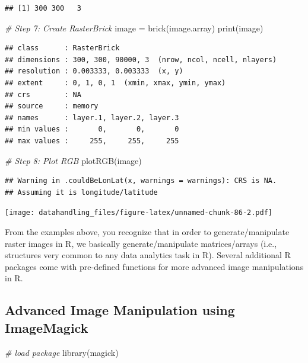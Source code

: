 \documentclass[
  12pt,
]{style/krantz}
\newenvironment{Shaded}{\begin{snugshade}}{\end{snugshade}}
\newcommand{\CommentTok}[1]{\textcolor[rgb]{0.56,0.35,0.01}{\textit{#1}}}
\newcommand{\FunctionTok}[1]{\textcolor[rgb]{0.00,0.00,0.00}{#1}}
\newcommand{\NormalTok}[1]{#1}
\newcommand{\OtherTok}[1]{\textcolor[rgb]{0.56,0.35,0.01}{#1}}
\begin{document}
\begin{verbatim}
## [1] 300 300   3
\end{verbatim}

\begin{Shaded}
\begin{Highlighting}[]
\CommentTok{\# Step 7: Create RasterBrick}
\NormalTok{image }\OtherTok{=} \FunctionTok{brick}\NormalTok{(image.array)}
\FunctionTok{print}\NormalTok{(image)}
\end{Highlighting}
\end{Shaded}

\begin{verbatim}
## class      : RasterBrick 
## dimensions : 300, 300, 90000, 3  (nrow, ncol, ncell, nlayers)
## resolution : 0.003333, 0.003333  (x, y)
## extent     : 0, 1, 0, 1  (xmin, xmax, ymin, ymax)
## crs        : NA 
## source     : memory
## names      : layer.1, layer.2, layer.3 
## min values :       0,       0,       0 
## max values :     255,     255,     255
\end{verbatim}

\begin{Shaded}
\begin{Highlighting}[]
\CommentTok{\# Step 8: Plot RGB}
\FunctionTok{plotRGB}\NormalTok{(image)}
\end{Highlighting}
\end{Shaded}

\begin{verbatim}
## Warning in .couldBeLonLat(x, warnings = warnings): CRS is NA.
## Assuming it is longitude/latitude
\end{verbatim}

\texttt{[image: datahandling\_files/figure-latex/unnamed-chunk-86-2.pdf]}

From the examples above, you recognize that in order to generate/manipulate raster images in R, we basically generate/manipulate matrices/arrays (i.e., structures very common to any data analytics task in R). Several additional R packages come with pre-defined functions for more advanced image manipulations in R.

\hypertarget{advanced-image-manipulation-using-imagemagick}{%
\subsection{Advanced Image Manipulation using ImageMagick}\label{advanced-image-manipulation-using-imagemagick}}

\begin{Shaded}
\begin{Highlighting}[]
\CommentTok{\# load package}
\FunctionTok{library}\NormalTok{(magick)}
\end{Highlighting}
\end{Shaded}
\end{document}
